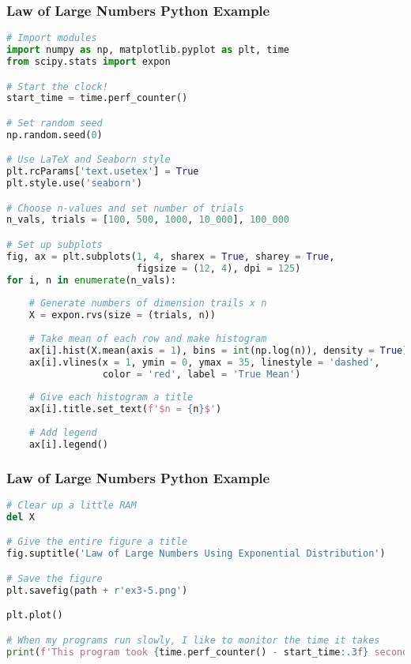 \documentclass{beamer}
\begin{document}
\begin{frame}[fragile]
\frametitle{Law of Large Numbers Python Example}

\begin{lstlisting}[language=Python]
# Import modules
import numpy as np, matplotlib.pyplot as plt, time
from scipy.stats import expon

# Start the clock!
start_time = time.perf_counter()

# Set random seed
np.random.seed(0)

# Use LaTeX and Seaborn style
plt.rcParams['text.usetex'] = True
plt.style.use('seaborn')

# Choose n-values and set number of trials
n_vals, trials = [100, 500, 1000, 10_000], 100_000

# Set up subplots
fig, ax = plt.subplots(1, 4, sharex = True, sharey = True, 
                       figsize = (12, 4), dpi = 125)
for i, n in enumerate(n_vals):
    
    # Generate numbers of dimension trails x n
    X = expon.rvs(size = (trials, n))   
     
    # Take mean of each row and make histogram
    ax[i].hist(X.mean(axis = 1), bins = int(np.log(n)), density = True)
    ax[i].vlines(x = 1, ymin = 0, ymax = 35, linestyle = 'dashed', 
                 color = 'red', label = 'True Mean')
    
    # Give each histogram a title
    ax[i].title.set_text(f'$n = {n}$')
    
    # Add legend
    ax[i].legend()
\end{lstlisting}
\end{frame}

\begin{frame}[fragile]
\frametitle{Law of Large Numbers Python Example}

\begin{lstlisting}[language=Python]
# Clear up a little RAM
del X

# Give the entire figure a title
fig.suptitle('Law of Large Numbers Using Exponential Distribution')

# Save the figure
plt.savefig(path + r'ex3-5.png')

plt.plot()

# When my programs run slowly, I like to monitor the time it takes
print(f'This program took {time.perf_counter() - start_time:.3f} seconds.')
\end{lstlisting}
\end{frame}
\end{document}

